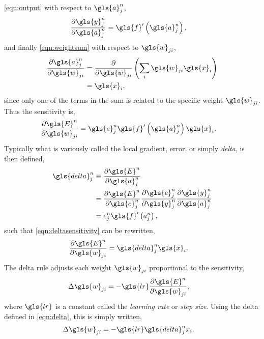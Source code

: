 \documentclass[thesis]{subfiles}
\begin{document}
\cref{eqn:output} with respect to $\gls{a}^n_j$,
\begin{equation}
\begin{aligned}
   \frac{\partial \gls{y}^n_j}{\partial \gls{a}^n_j}  &= \gls{f}'\left( \gls{a}^n_j \right),
\end{aligned}
\label{eqn:partialdyda}
\end{equation}
%
and finally \cref{eqn:weightsum} with respect to $\gls{w}_{ji}$,
\begin{equation}
\begin{aligned}
   \frac{\partial \gls{a}^n_j}{\partial \gls{w}_{ji}} &= \frac{\partial}{\partial \gls{w}_{ji}} \left( \sum_i \gls{w}_{ji} \gls{x}_{i} \right)\\
   &= \gls{x}_i,
\end{aligned}
\label{eqn:sumonetermpartial}
\end{equation}
since only one of the terms in the sum is related to the specific weight $\gls{w}_{ji}$. Thus the sensitivity is,
\begin{equation}
\label{eqn:deltasensitivity}
\begin{aligned}
    \frac{\partial \gls{E}^n}{\partial \gls{w}_{ji}} &= \gls{e}^n_j  \gls{f}'\left( \gls{a}^n_j \right) \gls{x}_i.
\end{aligned}
\end{equation}
%
Typically what is variously called the local gradient, error, or simply \emph{delta}, is then defined,
\begin{equation}
\label{eqn:delta}
\begin{aligned}
    \gls{delta}^n_j &\equiv \frac{\partial \gls{E}^n}{\partial \gls{a}^n_j}\\
    &= \frac{\partial \gls{E}^n}{\partial \gls{e}^n_j}\frac{\partial \gls{e}^n_j}{\partial \gls{y}^n_j} \frac{\partial \gls{y}^n_j}{\partial \gls{a}^n_j}\\
    &= e^n_j  \gls{f}'\left( a^n_j \right),
\end{aligned}
\end{equation}
%
such that \cref{eqn:deltasensitivity} can be rewritten,
\begin{equation}
\begin{aligned}
    \frac{\partial \gls{E}^n}{\partial \gls{w}_{ji}} &= \gls{delta}^n_j \gls{x}_i.
\end{aligned}
\end{equation}
%
The delta rule adjusts each weight $\gls{w}_{ji}$ proportional to the sensitivity, 
\begin{equation}
\begin{aligned}
    \Delta \gls{w}_{ji} &= -\gls{lr} \frac{\partial \gls{E}^n}{\partial \gls{w}_{ji}},
\end{aligned}
\end{equation}
%
where $\gls{lr}$ is a constant called the \emph{learning rate} or \emph{step size}. Using the delta defined in \cref{eqn:delta}, this is simply written,
\begin{equation}
\begin{aligned}
    \Delta \gls{w}_{ji} &= -\gls{lr} \gls{delta}^n_j x_i.
\end{aligned}
\end{equation}
%
\end{document}
